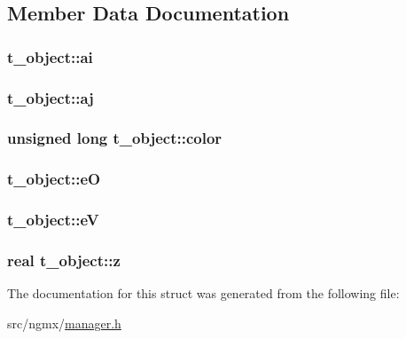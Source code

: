 \subsection{\-Member \-Data \-Documentation}
\hypertarget{structt__object_acf24fac8afd483e0859437f68ad2ecc2}{
\subsubsection[{ai}]{ {\bf t\-\_\-object\-::ai}}}\label{structt__object_acf24fac8afd483e0859437f68ad2ecc2}
\hypertarget{structt__object_a64c1e802eb2adb61ceb3dd98b88a6f87}{
\subsubsection[{aj}]{ {\bf t\-\_\-object\-::aj}}}\label{structt__object_a64c1e802eb2adb61ceb3dd98b88a6f87}
\hypertarget{structt__object_a7a2e1c430c16c0b7b1e7c696195c4d5c}{
\subsubsection[{color}]{\setlength{\rightskip}{0pt plus 5cm}unsigned long {\bf t\-\_\-object\-::color}}}\label{structt__object_a7a2e1c430c16c0b7b1e7c696195c4d5c}
\hypertarget{structt__object_aeb73102728cf5ad8a4686c213c98f37e}{
\subsubsection[{e\-O}]{ {\bf t\-\_\-object\-::e\-O}}}\label{structt__object_aeb73102728cf5ad8a4686c213c98f37e}
\hypertarget{structt__object_a2103f5af08e19efddfc3abb5d1539b31}{
\subsubsection[{e\-V}]{ {\bf t\-\_\-object\-::e\-V}}}\label{structt__object_a2103f5af08e19efddfc3abb5d1539b31}
\hypertarget{structt__object_a91268bf89ef8b574d4b613327fcf2016}{
\subsubsection[{z}]{\setlength{\rightskip}{0pt plus 5cm}real {\bf t\-\_\-object\-::z}}}\label{structt__object_a91268bf89ef8b574d4b613327fcf2016}


\-The documentation for this struct was generated from the following file\-:\begin{DoxyCompactItemize}
\item 
src/ngmx/\hyperlink{manager_8h}{manager.\-h}\end{DoxyCompactItemize}
